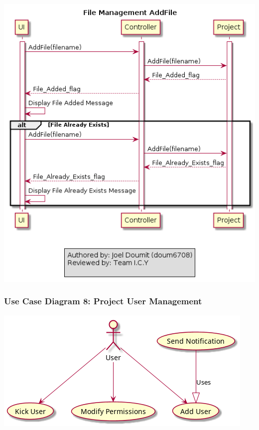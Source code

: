 \documentclass[twoside,letterpaper]{article}
\begin{document}
\includegraphics[width=\textwidth]{images/SequenceDiagrams/FM_AddFile_Image}

\newpage

\subsubsection[Use Case Diagram 8: Project User Management]{\rmfamily\bfseries\color{black}
	Use Case Diagram 8: Project User Management}

\includegraphics[width=\textwidth]{images/UseCaseDiagrams/ProjectUserManagement}

\newpage
\end{document}
